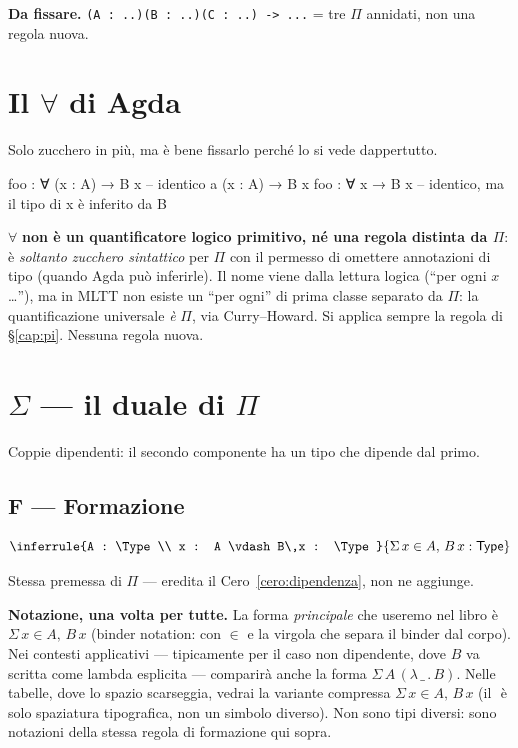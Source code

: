 \bigskip

\noindent\textbf{Da fissare.} \texttt{(A : ..)(B : ..)(C : ..) -> ...} = tre $\Pi$ annidati, non una regola nuova.

\chapter{Il $\forall$ di Agda}\label{cap:forall}

Solo zucchero in pi\`u, ma \`e bene fissarlo perch\'e lo si vede dappertutto.

\begin{agda}
foo : ∀ (x : A) → B x       -- identico a (x : A) → B x
foo : ∀ x → B x             -- identico, ma il tipo di x è inferito da B
\end{agda}

$\forall$ \textbf{non \`e un quantificatore logico primitivo, n\'e una regola distinta da $\Pi$}: \`e \emph{soltanto zucchero sintattico} per $\Pi$ con il permesso di omettere annotazioni di tipo (quando Agda pu\`o inferirle). Il nome viene dalla lettura logica (``per ogni $x$\ldots''), ma in MLTT non esiste un ``per ogni'' di prima classe separato da $\Pi$: la quantificazione universale \emph{\`e} $\Pi$, via Curry--Howard. Si applica sempre la regola di \S\ref{cap:pi}. Nessuna regola nuova.

\chapter{$\Sigma$ --- il duale di $\Pi$}\label{cap:sigma}

Coppie dipendenti: il secondo componente ha un tipo che dipende dal primo.

\section*{F --- Formazione}
\[
\inferrule{A : \Type \\ x : A \vdash B\,x : \Type}{\Sigma\,x \in A,\,B\,x : \Type}
\]

Stessa premessa di $\Pi$ --- eredita il Cero~\ref{cero:dipendenza}, non ne aggiunge.

\bigskip

\noindent\textbf{Notazione, una volta per tutte.} La forma \emph{principale} che useremo nel libro \`e $\Sigma\,x \in A,\,B\,x$ (binder notation: con $\in$ e la virgola che separa il binder dal corpo). Nei contesti applicativi --- tipicamente per il caso non dipendente, dove $B$ va scritta come lambda esplicita --- comparir\`a anche la forma $\Sigma\,A\,(\lambda\,\_\,.\,B)$. Nelle tabelle, dove lo spazio scarseggia, vedrai la variante compressa $\Sigma\,x\!\in\!A,\,B\,x$ (il $\!$ \`e solo spaziatura tipografica, non un simbolo diverso). Non sono tipi diversi: sono notazioni della stessa regola di formazione qui sopra.

